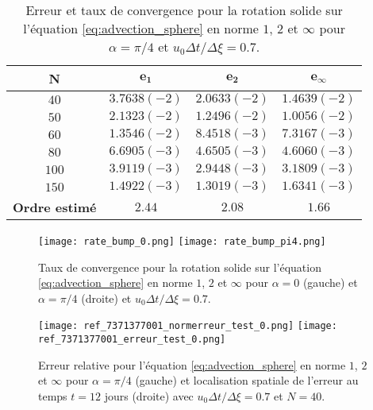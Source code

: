 \begin{table}[htbp]
\begin{center}
\begin{tabular}{|c||c|c|c|}
\hline
\textbf{N}  & $\mathbf{e_1}$ & $\mathbf{e_2}$ & $\mathbf{e_{\infty}}$\\
\hline
\hline
$40$  & $3.7638 (-2)$ & $2.0633 (-2)$ & $1.4639 (-2)$ \\
$50$  & $2.1323 (-2)$ & $1.2496 (-2)$ & $1.0056 (-2)$ \\
$60$  & $1.3546 (-2)$ & $8.4518 (-3)$ & $7.3167 (-3)$ \\
$80$  & $6.6905 (-3)$ & $4.6505 (-3)$ & $4.6060 (-3)$ \\
$100$  & $3.9119 (-3)$ & $2.9448 (-3)$ & $3.1809 (-3)$ \\
$150$  & $1.4922 (-3)$ & $1.3019 (-3)$ & $1.6341 (-3)$ \\
\hline 
\hline
\textbf{Ordre estimé}& $2.44$ & $2.08$ & $1.66$\\
\hline
\end{tabular}
\end{center}
\caption{Erreur et taux de convergence pour la rotation solide sur l'équation \eqref{eq:advection_sphere} en norme $1$, $2$ et $\infty$ pour $\alpha = \pi / 4$ et $u_0 \Delta t / \Delta \xi = 0.7$.}
\label{tab:rate2_bump}
\end{table} 

\begin{figure}[htbp]
\begin{center}
\texttt{[image: rate\_bump\_0.png]}
\texttt{[image: rate\_bump\_pi4.png]}
\end{center}
\caption{Taux de convergence pour la rotation solide sur l'équation \eqref{eq:advection_sphere} en norme $1$, $2$ et $\infty$ pour $\alpha = 0$ (gauche) et $\alpha = \pi / 4$ (droite) et $u_0 \Delta t / \Delta \xi = 0.7$.}
\label{fig:rate_bump}
\end{figure}

\begin{figure}[htbp]
\begin{center}
\texttt{[image: ref\_7371377001\_normerreur\_test\_0.png]}
\texttt{[image: ref\_7371377001\_erreur\_test\_0.png]}
\end{center}
\caption{Erreur relative pour l'équation \eqref{eq:advection_sphere} en norme $1$, $2$ et $\infty$ pour $\alpha = \pi/4$ (gauche) et localisation spatiale de l'erreur au temps $t=12$ jours (droite) avec $u_0 \Delta t / \Delta \xi = 0.7$ et $N=40$.}
\label{fig:erreur_bump}
\end{figure}

